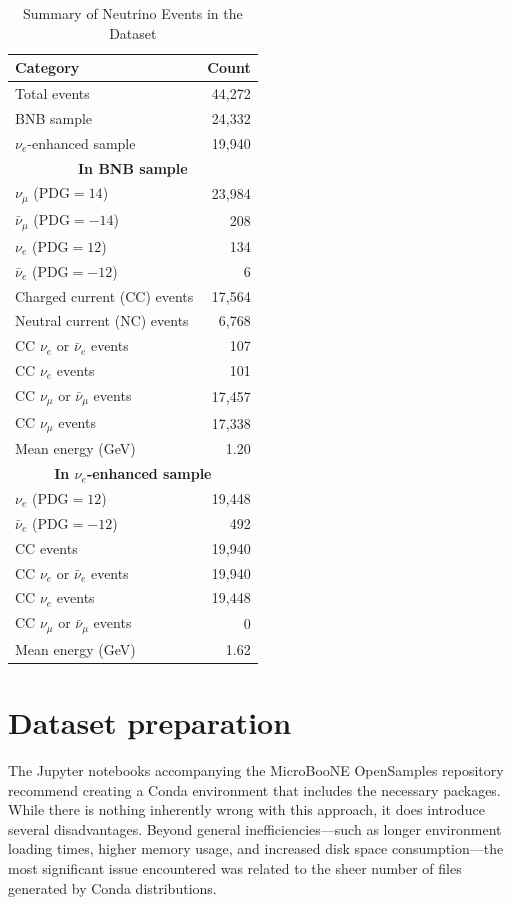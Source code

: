 \documentclass{pracalicmgr}
\begin{document}
\begin{table}[h]
\centering
\caption{Summary of Neutrino Events in the Dataset}
\begin{tabular}{|l|r|}
\hline
\textbf{Category} & \textbf{Count} \\
\hline
Total events & 44,272 \\
BNB sample & 24,332 \\
$\nu_e$-enhanced sample & 19,940 \\
\hline
\multicolumn{2}{|c|}{\textbf{In BNB sample}} \\
\hline
$\nu_{\mu}$ ($\text{PDG}=14$) & 23,984 \\
$\bar{\nu}_{\mu}$ ($\text{PDG}=-14$) & 208 \\
$\nu_e$ ($\text{PDG}=12$) & 134 \\
$\bar{\nu}_e$ ($\text{PDG}=-12$) & 6 \\
Charged current (CC) events & 17,564 \\
Neutral current (NC) events & 6,768 \\
CC $\nu_e$ or $\bar{\nu}_e$ events & 107 \\
CC $\nu_e$ events & 101 \\
CC $\nu_{\mu}$ or $\bar{\nu}_{\mu}$ events & 17,457 \\
CC $\nu_{\mu}$ events & 17,338 \\
Mean energy (GeV) & 1.20 \\
\hline
\multicolumn{2}{|c|}{\textbf{In $\nu_e$-enhanced sample}} \\
\hline
$\nu_e$ ($\text{PDG}=12$) & 19,448 \\
$\bar{\nu}_e$ ($\text{PDG}=-12$) & 492 \\
CC events & 19,940 \\
CC $\nu_e$ or $\bar{\nu}_e$ events & 19,940 \\
CC $\nu_e$ events & 19,448 \\
CC $\nu_{\mu}$ or $\bar{\nu}_{\mu}$ events & 0 \\
Mean energy (GeV) & 1.62 \\
\hline
\end{tabular}
\end{table}

\chapter{Dataset preparation}

The Jupyter notebooks accompanying the MicroBooNE OpenSamples repository recommend creating a Conda environment that includes the necessary packages. While there is nothing inherently wrong with this approach, it does introduce several disadvantages. Beyond general inefficiencies—such as longer environment loading times, higher memory usage, and increased disk space consumption—the most significant issue encountered was related to the sheer number of files generated by Conda distributions.
\end{document}
